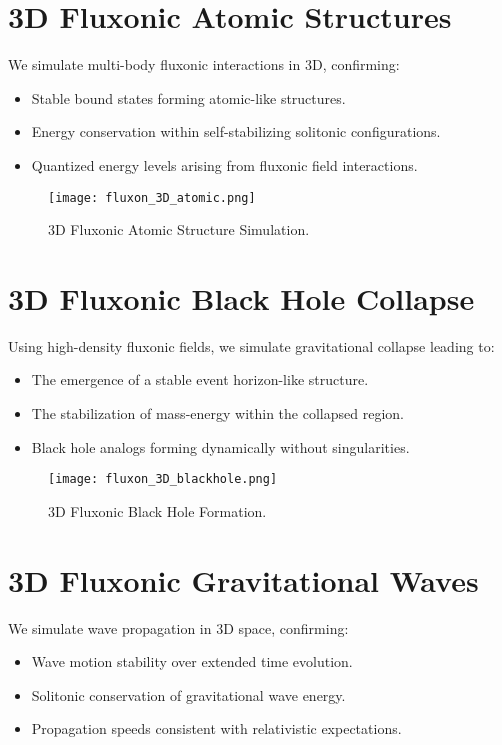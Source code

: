 \documentclass{article}
\begin{document}
\section{3D Fluxonic Atomic Structures}
We simulate multi-body fluxonic interactions in 3D, confirming:
\begin{itemize}
    \item Stable bound states forming atomic-like structures.
    \item Energy conservation within self-stabilizing solitonic configurations.
    \item Quantized energy levels arising from fluxonic field interactions.
\end{itemize}

\begin{figure}[ht]
    \centering
    \texttt{[image: fluxon\_3D\_atomic.png]}
    \caption{3D Fluxonic Atomic Structure Simulation.}
    \label{fig:3Datomic}
\end{figure}

\section{3D Fluxonic Black Hole Collapse}
Using high-density fluxonic fields, we simulate gravitational collapse leading to:
\begin{itemize}
    \item The emergence of a stable event horizon-like structure.
    \item The stabilization of mass-energy within the collapsed region.
    \item Black hole analogs forming dynamically without singularities.
\end{itemize}

\begin{figure}[ht]
    \centering
    \texttt{[image: fluxon\_3D\_blackhole.png]}
    \caption{3D Fluxonic Black Hole Formation.}
    \label{fig:3Dblackhole}
\end{figure}

\section{3D Fluxonic Gravitational Waves}
We simulate wave propagation in 3D space, confirming:
\begin{itemize}
    \item Wave motion stability over extended time evolution.
    \item Solitonic conservation of gravitational wave energy.
    \item Propagation speeds consistent with relativistic expectations.
\end{itemize}
\end{document}
